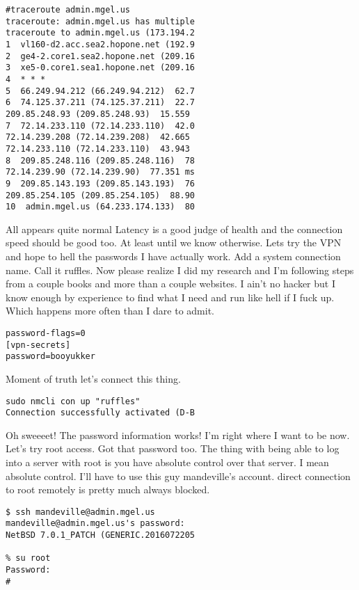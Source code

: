 \begin{verbatim}
#traceroute admin.mgel.us
traceroute: admin.mgel.us has multiple
traceroute to admin.mgel.us (173.194.2
1  vl160-d2.acc.sea2.hopone.net (192.9
2  ge4-2.core1.sea2.hopone.net (209.16
3  xe5-0.core1.sea1.hopone.net (209.16
4  * * *
5  66.249.94.212 (66.249.94.212)  62.7
6  74.125.37.211 (74.125.37.211)  22.7
209.85.248.93 (209.85.248.93)  15.559 
7  72.14.233.110 (72.14.233.110)  42.0
72.14.239.208 (72.14.239.208)  42.665 
72.14.233.110 (72.14.233.110)  43.943 
8  209.85.248.116 (209.85.248.116)  78
72.14.239.90 (72.14.239.90)  77.351 ms
9  209.85.143.193 (209.85.143.193)  76
209.85.254.105 (209.85.254.105)  88.90
10  admin.mgel.us (64.233.174.133)  80	
\end{verbatim}
\medskip

All appears quite normal Latency is a good judge of health and the connection speed should be good too. At least until we know otherwise. Lets try the VPN and hope to hell the passwords I have actually work. Add a system connection name. Call it ruffles. Now please realize I did my research and I'm following steps from a couple books and more than a couple websites. I ain't no hacker but I know enough by experience to find what I need and run like hell if I fuck up. Which happens more often than I dare to admit.

\begin{verbatim}
password-flags=0
[vpn-secrets]
password=booyukker
\end{verbatim}
\medskip

Moment of truth let's connect this thing.

\begin{verbatim}
sudo nmcli con up "ruffles"
Connection successfully activated (D-B
\end{verbatim}
\medskip

Oh sweeeet! The password information works! I'm right where I want to be now. Let's try root access. Got that password too. The thing with being able to log into a server with root is you have absolute control over that server. I mean absolute control. I'll have to use this guy mandeville's account. direct connection to root remotely is pretty much always blocked.

\begin{verbatim}
$ ssh mandeville@admin.mgel.us
mandeville@admin.mgel.us's password: 
NetBSD 7.0.1_PATCH (GENERIC.2016072205

% su root
Password:
# 
\end{verbatim}
\medskip

